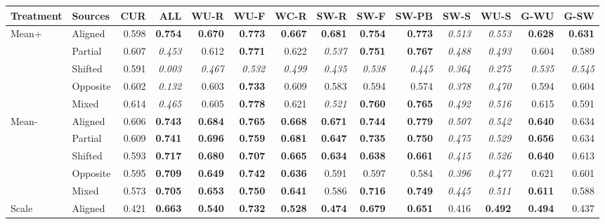 \begin{tabular}{@{}llrrrrrrrrrrrr@{}}
\toprule
Treatment & Sources & CUR & ALL & WU-R & WU-F & WC-R & SW-R & SW-F & SW-PB & SW-S & WU-S & G-WU & G-SW\\
\midrule
Mean+ & Aligned & 0.598 & \textbf{0.754} & \textbf{0.670} & \textbf{0.773} & \textbf{0.667} & \textbf{0.681} & \textbf{0.754} & \textbf{0.773} & \textit{0.513} & \textit{0.553} & \textbf{0.628} & \textbf{0.631}\\
 & Partial & 0.607 & \textit{0.453} & 0.612 & \textbf{0.771} & 0.622 & \textit{0.537} & \textbf{0.751} & \textbf{0.767} & \textit{0.488} & \textit{0.493} & 0.604 & 0.589\\
 & Shifted & 0.591 & \textit{0.003} & \textit{0.467} & \textit{0.532} & \textit{0.499} & \textit{0.435} & \textit{0.538} & \textit{0.445} & \textit{0.364} & \textit{0.275} & \textit{0.535} & \textit{0.545}\\
 & Opposite & 0.602 & \textit{0.132} & 0.603 & \textbf{0.733} & 0.609 & 0.583 & 0.594 & 0.574 & \textit{0.378} & \textit{0.470} & 0.594 & 0.604\\
 & Mixed & 0.614 & \textit{0.465} & 0.605 & \textbf{0.778} & 0.621 & \textit{0.521} & \textbf{0.760} & \textbf{0.765} & \textit{0.492} & \textit{0.516} & 0.615 & 0.591\\
\addlinespace[2pt]
Mean- & Aligned & 0.606 & \textbf{0.743} & \textbf{0.684} & \textbf{0.765} & \textbf{0.668} & \textbf{0.671} & \textbf{0.744} & \textbf{0.779} & \textit{0.507} & \textit{0.542} & \textbf{0.640} & 0.634\\
 & Partial & 0.609 & \textbf{0.741} & \textbf{0.696} & \textbf{0.759} & \textbf{0.681} & \textbf{0.647} & \textbf{0.735} & \textbf{0.750} & \textit{0.475} & \textit{0.529} & \textbf{0.656} & 0.634\\
 & Shifted & 0.593 & \textbf{0.717} & \textbf{0.680} & \textbf{0.707} & \textbf{0.665} & \textbf{0.634} & \textbf{0.638} & \textbf{0.661} & \textit{0.415} & \textit{0.526} & \textbf{0.640} & 0.613\\
 & Opposite & 0.595 & \textbf{0.709} & \textbf{0.649} & \textbf{0.742} & \textbf{0.636} & 0.591 & 0.597 & 0.584 & \textit{0.396} & \textit{0.477} & 0.621 & 0.601\\
 & Mixed & 0.573 & \textbf{0.705} & \textbf{0.653} & \textbf{0.750} & \textbf{0.641} & 0.586 & \textbf{0.716} & \textbf{0.749} & \textit{0.445} & \textit{0.511} & \textbf{0.611} & 0.588\\
\addlinespace[2pt]
Scale & Aligned & 0.421 & \textbf{0.663} & \textbf{0.540} & \textbf{0.732} & \textbf{0.528} & \textbf{0.474} & \textbf{0.679} & \textbf{0.651} & 0.416 & \textbf{0.492} & \textbf{0.494} & 0.437\\

\end{tabular}
